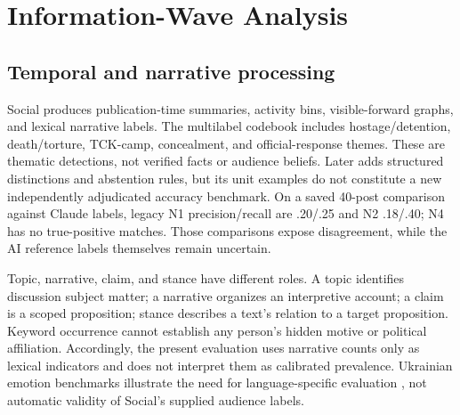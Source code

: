 \section{Information-Wave Analysis}
\subsection{Temporal and narrative processing}
Social produces publication-time summaries, activity bins, visible-forward graphs, and lexical narrative labels. The multilabel codebook includes hostage/detention, death/torture, TCK-camp, concealment, and official-response themes. These are thematic detections, not verified facts or audience beliefs. Later  adds structured distinctions and abstention rules, but its unit examples do not constitute a new independently adjudicated accuracy benchmark. On a saved 40-post comparison against Claude labels, legacy N1 precision/recall are .20/.25 and N2 .18/.40; N4 has no true-positive matches. Those comparisons expose disagreement, while the AI reference labels themselves remain uncertain.

Topic, narrative, claim, and stance have different roles. A topic identifies discussion subject matter; a narrative organizes an interpretive account; a claim is a scoped proposition; stance describes a text's relation to a target proposition. Keyword occurrence cannot establish any person's hidden motive or political affiliation. Accordingly, the present evaluation uses narrative counts only as lexical indicators and does not interpret them as calibrated prevalence. Ukrainian emotion benchmarks illustrate the need for language-specific evaluation \citep{dementieva2025emobench}, not automatic validity of Social's supplied audience labels.

